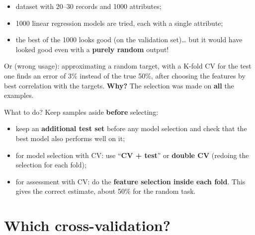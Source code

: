 \begin{itemize}
\tightlist
\item
  dataset with 20--30 records and 1000 attributes;
\item
  1000 linear regression models are tried, each with a single
  attribute;
\item
  the best of the 1000 looks good (on the validation set)\ldots{} but it
  would have looked good even with a \textbf{purely random} output!
\end{itemize}

Or (wrong usage): approximating a random target, with a K-fold CV for
the test one finds an error of 3\% instead of the true 50\%, after
choosing the features by best correlation with the targets.
\textbf{Why?} The selection was made on \textbf{all} the examples.

What to do? Keep samples aside \textbf{before} selecting:

\begin{itemize}
\tightlist
\item
  keep an \textbf{additional test set} before any model selection and
  check that the best model also performs well on it;
\item
  for model selection with CV: use ``\textbf{CV + test}'' or
  \textbf{double CV} (redoing the selection for each fold);
\item
  for assessment with CV: do the \textbf{feature selection inside each
  fold}. This gives the correct estimate, about 50\% for the random
  task.
\end{itemize}

\section{Which cross-validation?}\label{quale-cross-validation}

